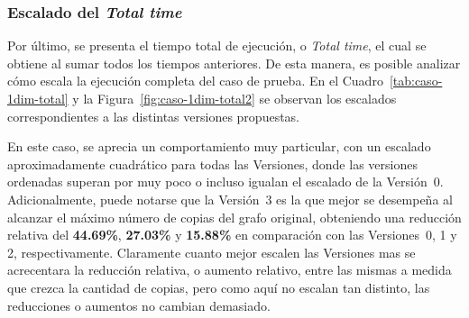 \subsubsection{Escalado del \textit{Total time}}

Por último, se presenta el tiempo total de ejecución, o \textit{Total time}, el cual se obtiene al sumar todos los tiempos anteriores. De esta manera, es posible analizar cómo escala la ejecución completa del caso de prueba. En el Cuadro~\ref{tab:caso-1dim-total} y la Figura~\ref{fig:caso-1dim-total2} se observan los escalados correspondientes a las distintas versiones propuestas.

En este caso, se aprecia un comportamiento muy particular, con un escalado aproximadamente cuadrático para todas las Versiones, donde las versiones ordenadas superan por muy poco o incluso igualan el escalado de la Versión~0. Adicionalmente, puede notarse que la Versión~3 es la que mejor se desempeña al alcanzar el máximo número de copias del grafo original, obteniendo una reducción relativa del \textbf{44{.}69\%}, \textbf{27{.}03\%} y \textbf{15{.}88\%} en comparación con las Versiones~0, 1 y 2, respectivamente. Claramente cuanto mejor escalen las Versiones mas se acrecentara la reducción relativa, o aumento relativo, entre las mismas a medida que crezca la cantidad de copias, pero como aquí no escalan tan distinto, las reducciones o aumentos no cambian demasiado.

\begin{table}[ht]
\centering
{}
\caption{Cuadro comparativo del \textit{Total time} de las diferentes versiones planteadas bajo un caso de prueba en una dimensión, variando el tamaño del caso de prueba}
\label{tab:caso-1dim-total}
\end{table}




